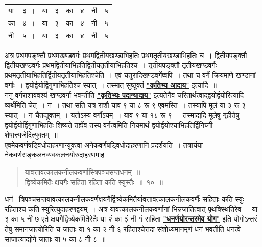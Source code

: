 \documentclass[11pt, openany]{book}
\begin{document}
\begin{tabular}{llllllll}
   या &३~।& या&३& का& ४& नी& ५ \\
 का &४~। &या& ३& का& ४& नी& ५ \\
 नी &५~।& या& ३& का& ४& नी& ५
\end{tabular}

\newpage
 अत्र प्रथमपङ्क्तौ प्रथमखण्डवर्गः प्रथमद्वितीयखण्डाभिहतिः प्रथमतृतीयखण्डाभिहतिः च~। द्वितीयपङ्क्तौ द्वितीयखण्डवर्गः प्रथमद्वितीयाभिहतिद्वितीयतृतीयाभिहतिश्च~। तृतीयपङ्क्तौ तृतीयखण्डवर्गः प्रथमतृतीयाभिहतिर्द्वितीयतृतीयाभिहतिश्चेति~। एवं चतुरादिखण्डवर्गेष्वपि~। तथा च वर्गे क्रियमाणे खण्डानां वर्गाः~। द्वयोर्द्वयोर्द्विगुणाभिहतिश्च स्यात्~। तस्मात् सुष्ठूक्तं \hyperref[1.11]{\textbf{"कृतिभ्य आदाय"}} इत्यादि~॥ \\

\vspace{-3mm}
 ननु वर्गराशाववश्यं खण्डवर्गा भवन्तीति \hyperref[1.11]{\textbf{"कृतिभ्यः पदान्यादाय"}} इत्यतेनैव चरितार्थत्वाद्द्वयोर्द्वयोरित्यादि व्यर्थमिति चेत्~। न~। तथा सति यत्र राशौ याव ९ या ८ रू ९ एवमस्ति~। तस्यापि मूलं या ३ रू ३ स्यात्~। न चैतद्युक्तम्~। यतोऽस्य वर्गोऽयम्~। याव ९ या १८ रू ९~। तस्माद्यदि मूलेषु गृहीतेषु द्वयोर्द्वयोर्द्विगुणाभिहतिः शिष्यते तर्ह्येव तस्य
वर्गत्वमिति नियमार्थं द्वयोर्द्वयोश्चाभिहतिर्द्विनिघ्नी शेषात्त्यजेदित्युक्तम्~॥ \\

\vspace{-3mm}
 एवमेकवर्णषड्विधोदाहरणान्युक्त्वा अनेकवर्णषड्विधोदाहरणानि प्रदर्शयति~। 
तत्रार्यया-नेकवर्णसङ्कलनव्यवकलनयोरुदाहरणमाह\textendash  

\begin{quote}
    \ex
    यावत्तावत्कालकनीलकवर्णास्त्रिपञ्चसप्तधनम्~॥\\

\vspace{-7mm}
\hspace{0.7cm} द्वित्र्येकमितैः क्षयगैः सहिता रहिता कति स्युस्तैः~॥~१०~॥
\end{quote}

 धनं ~त्रिपञ्चसप्तयावत्कालकनीलकवर्णक्षयगैर्द्वित्र्येकमितैर्यावत्तावत्कालकनीलकवर्णैः सहिताः कति स्युः रहिताश्च कति स्युरित्युदाहरणद्वयम्~। अत्र यावत्कालकनीलकवर्णानां भिन्नजातित्वात् पृथक्स्थितिरेव~। या ३ का ५ नी ७ एते क्षयगैर्द्वित्र्येकमितैरेतैः या २ं का ३ं नी १ं सहिता \hyperref[1.3.1]{\textbf{"धनर्णयोरन्तरमेव योग"}} इति योगोऽन्तरं तेषु समानजात्योरिति च जाताः या १ का २ नी ६ 
रहिताश्चेत्तदा संशोध्यमानमृणं धनं भवतीति धनत्वे साजात्याद्योगे जाताः 
या ५ का ८ नी ८~॥
\newpage
\end{document}
